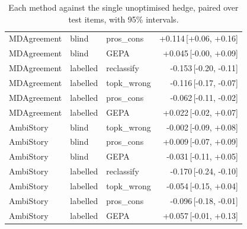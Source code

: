 \begin{table}[t]
\begin{tabular}{lllr}
MDAgreement & blind & pros\_cons & +0.114{\scriptsize\,[+0.06, +0.16]} \\
MDAgreement & blind & GEPA & +0.045{\scriptsize\,[-0.00, +0.09]} \\
MDAgreement & labelled & reclassify & -0.153{\scriptsize\,[-0.20, -0.11]} \\
MDAgreement & labelled & topk\_wrong & -0.116{\scriptsize\,[-0.17, -0.07]} \\
MDAgreement & labelled & pros\_cons & -0.062{\scriptsize\,[-0.11, -0.02]} \\
MDAgreement & labelled & GEPA & +0.022{\scriptsize\,[-0.02, +0.07]} \\
AmbiStory & blind & topk\_wrong & -0.002{\scriptsize\,[-0.09, +0.08]} \\
AmbiStory & blind & pros\_cons & +0.009{\scriptsize\,[-0.07, +0.09]} \\
AmbiStory & blind & GEPA & -0.031{\scriptsize\,[-0.11, +0.05]} \\
AmbiStory & labelled & reclassify & -0.170{\scriptsize\,[-0.24, -0.10]} \\
AmbiStory & labelled & topk\_wrong & -0.054{\scriptsize\,[-0.15, +0.04]} \\
AmbiStory & labelled & pros\_cons & -0.096{\scriptsize\,[-0.18, -0.01]} \\
AmbiStory & labelled & GEPA & +0.057{\scriptsize\,[-0.01, +0.13]} \\
\hline
\end{tabular}
\caption{Each method against the single unoptimised hedge, paired over test items, with 95\% intervals.}
\label{tab:paired-methods}
\end{table}